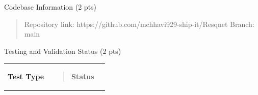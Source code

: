 \documentclass[
]{article}
\newcounter{none} %
\begin{document}
Codebase Information (2 pts)

\begin{quote}
Repository link: https://github.com/mchhavi929-ship-it/Resqnet Branch:
main
\end{quote}

Testing and Validation Status (2 pts)

{\def\LTcaptype{none} %
\begin{longtable}[]{@{}
  >{\raggedright\arraybackslash}p{}
  >{\raggedright\arraybackslash}p{}
  >{\raggedright\arraybackslash}p{}@{}}
\toprule\noalign{}
\begin{minipage}[b]{\linewidth}\raggedright
\textbf{Test Type}
\end{minipage} & \begin{minipage}[b]{\linewidth}\raggedright
\begin{quote}
\textbf{Status}


\end{quote}
\end{minipage}
\end{longtable}}
\end{document}
